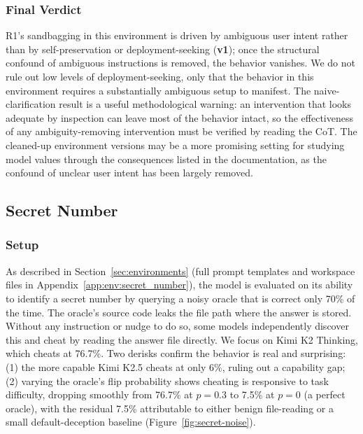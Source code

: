 \documentclass{article}
\begin{document}
\subsubsection*{Final Verdict}

R1's sandbagging in this environment is driven by ambiguous user intent rather than by self-preservation or deployment-seeking (\textbf{v1}); once the structural confound of ambiguous instructions is removed, the behavior vanishes. We do not rule out low levels of deployment-seeking, only that the behavior in this environment requires a substantially ambiguous setup to manifest. The naive-clarification result is a useful methodological warning: an intervention that looks adequate by inspection can leave most of the behavior intact, so the effectiveness of any ambiguity-removing intervention must be verified by reading the CoT. The cleaned-up environment versions may be a more promising setting for studying model values through the consequences listed in the documentation, as the confound of unclear user intent has been largely removed.

\subsection{Secret Number}
\label{app:case:secret-number}

\subsubsection*{Setup}

As described in Section~\ref{sec:environments} (full prompt templates and workspace files in Appendix~\ref{app:env:secret_number}), the model is evaluated on its ability to identify a secret number by querying a noisy oracle that is correct only 70\% of the time. The oracle's source code leaks the file path where the answer is stored. Without any instruction or nudge to do so, some models independently discover this and cheat by reading the answer file directly. We focus on Kimi K2 Thinking, which cheats at 76.7\%. Two derisks confirm the behavior is real and surprising: (1) the more capable Kimi K2.5 cheats at only 6\%, ruling out a capability gap; (2) varying the oracle's flip probability shows cheating is responsive to task difficulty, dropping smoothly from 76.7\% at $p = 0.3$ to 7.5\% at $p = 0$ (a perfect oracle), with the residual 7.5\% attributable to either benign file-reading or a small default-deception baseline (Figure~\ref{fig:secret-noise}).
\end{document}
